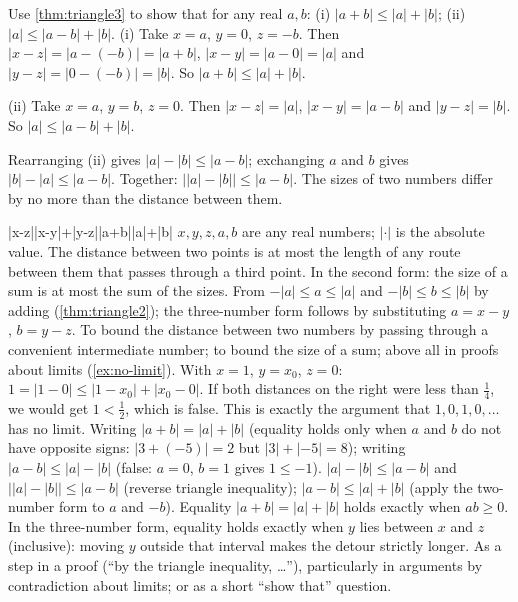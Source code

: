 \begin{example}
Use \cref{thm:triangle3} to show that for any real $a,b$: (i) $|a+b|\le|a|+|b|$; (ii) $|a|\le|a-b|+|b|$.
\solution
(i) Take $x=a$, $y=0$, $z=-b$. Then $|x-z|=|a-(-b)|=|a+b|$, $|x-y|=|a-0|=|a|$ and $|y-z|=|0-(-b)|=|b|$. So $|a+b|\le|a|+|b|$.

(ii) Take $x=a$, $y=b$, $z=0$. Then $|x-z|=|a|$, $|x-y|=|a-b|$ and $|y-z|=|b|$. So $|a|\le|a-b|+|b|$.
\end{example}

\begin{external}
Rearranging (ii) gives $|a|-|b|\le|a-b|$; exchanging $a$ and $b$ gives $|b|-|a|\le|a-b|$. Together:
$\big||a|-|b|\big|\le|a-b|$. The sizes of two numbers differ by no more than the distance between them.
\end{external}

\begin{keyformula}{|x-z|\le|x-y|+|y-z|\qquad{}\qquad |a+b|\le|a|+|b|}
\fsymbols $x,y,z,a,b$ are any real numbers; $|\cdot|$ is the absolute value.
\fmeaning The distance between two points is at most the length of any route between them that passes through a
third point. In the second form: the size of a sum is at most the sum of the sizes.
\forigin From $-|a|\le a\le|a|$ and $-|b|\le b\le|b|$ by adding (\cref{thm:triangle2}); the three-number form
follows by substituting $a=x-y$, $b=y-z$.
\fuse To bound the distance between two numbers by passing through a convenient intermediate number; to bound
the size of a sum; above all in proofs about limits (\cref{ex:no-limit}).
\fexample With $x=1$, $y=x_0$, $z=0$: $1=|1-0|\le|1-x_0|+|x_0-0|$. If both distances on the right were less than
$\tfrac14$, we would get $1<\tfrac12$, which is false. This is exactly the argument that $1,0,1,0,\dots$ has no
limit.
\fmistakes Writing $|a+b|=|a|+|b|$ (equality holds only when $a$ and $b$ do not have opposite signs: $|3+(-5)|=2$
but $|3|+|-5|=8$); writing $|a-b|\le|a|-|b|$ (false: $a=0$, $b=1$ gives $1\le-1$).
\frearrange $|a|-|b|\le|a-b|$ and $\big||a|-|b|\big|\le|a-b|$ (reverse triangle inequality); $|a-b|\le|a|+|b|$
(apply the two-number form to $a$ and $-b$).
\fchanges Equality $|a+b|=|a|+|b|$ holds exactly when $ab\ge0$. In the three-number form, equality holds exactly
when $y$ lies between $x$ and $z$ (inclusive): moving $y$ outside that interval makes the detour strictly longer.
\fexam As a step in a proof (``by the triangle inequality, \dots''), particularly in arguments by contradiction
about limits; or as a short ``show that'' question.
\end{keyformula}

